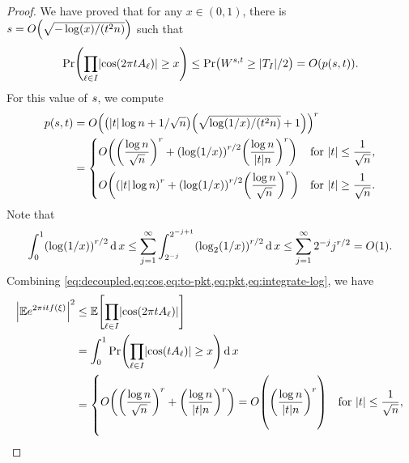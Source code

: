\documentclass{daj}
\theoremstyle{plain}
\theoremstyle{plain}
\theoremstyle{plain}
\theoremstyle{plain}
\theoremstyle{definition}
\theoremstyle{plain}
\theoremstyle{plain}
\theoremstyle{definition}
\theoremstyle{definition}
\theoremstyle{plain}
\let\originalleft\left
\let\originalright\right
\renewcommand{\left}{\mathopen{}\mathclose\bgroup\originalleft}
\renewcommand{\right}{\aftergroup\egroup\originalright}
\begin{document}
\begin{proof}
We have proved that for any $x\in (0,1)$, there is $\posreal =O\left(\sqrt{-\log(x)/(t^{2}n)}\right)$ such that
\begin{equation}
\Pr\left(\prod_{\ell\in I}\left|\cos\left(2\pi tA_{\ell}\right)\right|\geq x\right)\leq \Pr\left(W^{\posreal ,t}\ge |T_I|/2\right)=O\left(p\left(\posreal ,t\right)\right).\label{eq:to-pkt}
\end{equation}
For this value of $s $, we compute
\begin{align}
p\left(\posreal ,t\right)&=O\left(\left(\left|t\right|\log n+1/{\sqrt n}\right) \left(\sqrt{\log(1/x)/(t^{2}n)}+1\right)\right)^{r}\notag\\
&=\begin{cases}
{\displaystyle O\left(\left(\frac{\log n}{\sqrt n}\right)^{r}+\left(\log\left(1/x\right)\right)^{r/2}\left(\frac{\log n}{|t|n}\right)^{r}\right)} & \text{for }\left|t\right|\le{\displaystyle \frac{1}{\sqrt{n}}},\vspace{5pt}\\
{\displaystyle O\left(\left(|t|\log n\right)^{r}+\left(\log\left(1/x\right)\right)^{r/2}\left(\frac{\log n}{\sqrt n}\right)^{r}\right)} & \text{for }\left|t\right|\ge{\displaystyle \frac{1}{\sqrt{n}}}.
\end{cases}\label{eq:pkt}
\end{align}
Note that
\begin{equation}
\int_{0}^{1}\left(\log\left(1/x\right)\right)^{r/2}\d x\le \sum_{j=1}^{\infty}\int_{2^{-j}}^{2^{-j+1}}\left(\log_2\left(1/x\right)\right)^{r/2}\d x\leq \sum_{j=1}^{\infty}2^{-j}j^{r/2}=O\left(1\right).\label{eq:integrate-log}
\end{equation}
Combining \cref{eq:decoupled,eq:cos,eq:to-pkt,eq:pkt,eq:integrate-log}, we have
\begin{align}
\left|\E e^{2\pi itf(\xi)}\right|^{2} &\le\E\left[\prod_{\ell\in I}\left|\cos\left(2\pi tA_{\ell}\right)\right|\right]\notag\\
&=\int_{0}^{1}\Pr\left(\prod_{\ell\in I}\left|\cos\left(tA_{\ell}\right)\right|\ge x\right)\d x\notag\\
 &=\begin{cases}
{\displaystyle O\left(\left(\frac{\log n}{\sqrt n}\right)^{r}+\left(\frac{\log n}{|t|n}\right)^{r}\right)=O\left(\vphantom{\frac{\frac{\int}{\int}}{\frac{\int}{\int}}}\left(\frac{\log n}{\left|t\right|n}\right)^{r}\right)} & \text{for }\left|t\right|\le{\displaystyle \frac{1}{\sqrt{n}}},\vspace{5pt}\\

\end{cases}
\end{align}
\end{proof}
\end{document}
